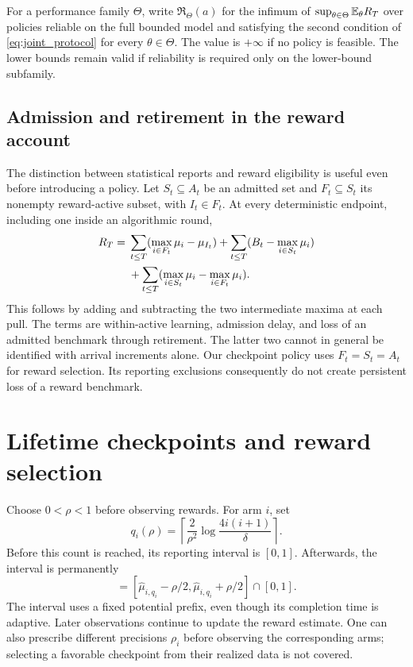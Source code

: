 \documentclass[11pt]{article}
\begin{document}
For a performance family $\Theta$, write $\mathfrak R_\Theta(a)$ for the
infimum of $\sup_{\theta\in\Theta}\mathbb E_\theta R_T$ over policies reliable on the
full bounded model and satisfying the second condition of
\eqref{eq:joint_protocol} for every $\theta\in\Theta$. The value is $+\infty$
if no policy is feasible. The lower bounds remain valid if reliability is
required only on the lower-bound subfamily.

\subsection{Admission and retirement in the reward account}

The distinction between statistical reports and reward eligibility is useful
even before introducing a policy. Let $S_t\subseteq A_t$ be an admitted set and
$F_t\subseteq S_t$ its nonempty reward-active subset, with $I_t\in F_t$.
At every deterministic endpoint, including one inside an algorithmic round,
\begin{align}
 R_T={}&\sum_{t\le T}(\max_{i\in F_t}\mu_i-\mu_{I_t})
 +\sum_{t\le T}(B_t-\max_{i\in S_t}\mu_i)\notag\\
 &+\sum_{t\le T}(\max_{i\in S_t}\mu_i-\max_{i\in F_t}\mu_i).
 \label{eq:three_part}
\end{align}
This follows by adding and subtracting the two intermediate maxima at each
pull. The terms are within-active learning, admission delay, and loss of an
admitted benchmark through retirement. The latter two cannot in general be
identified with arrival increments alone. Our checkpoint policy uses
$F_t=S_t=A_t$ for reward selection. Its reporting exclusions consequently
do not create persistent loss of a reward benchmark.
\section{Lifetime checkpoints and reward selection}
\label{sec:method}

Choose $0<\rho<1$ before observing rewards. For arm $i$, set
\begin{equation}
 q_i(\rho)=\left\lceil\frac2{\rho^2}
                  \log\frac{4i(i+1)}\delta\right\rceil.
 \label{eq:checkpoint}
\end{equation}
Before this count is reached, its reporting interval is $[0,1]$. Afterwards,
the interval is permanently
\begin{equation}
 [\ell_i,u_i]=[\widehat\mu_{i,q_i}-\rho/2,
                 \widehat\mu_{i,q_i}+\rho/2]\cap[0,1].
 \label{eq:fixed_interval}
\end{equation}
The interval uses a fixed potential prefix, even though its completion time is
adaptive. Later observations continue to update the reward estimate. One can
also prescribe different precisions $\rho_i$ before observing the corresponding
arms; selecting a favorable checkpoint from their realized data is not covered.
\end{document}
